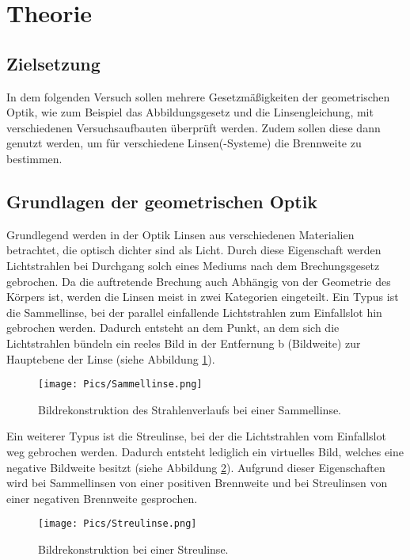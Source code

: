 \section{Theorie}

\subsection{Zielsetzung}

In dem folgenden Versuch sollen mehrere Gesetzmäßigkeiten der geometrischen Optik,
wie zum Beispiel das Abbildungsgesetz und die Linsengleichung, mit verschiedenen
Versuchsaufbauten überprüft werden. Zudem sollen diese dann genutzt werden, um
für verschiedene Linsen(-Systeme) die Brennweite zu bestimmen.

\subsection{Grundlagen der geometrischen Optik}

Grundlegend werden in der Optik Linsen aus verschiedenen Materialien betrachtet,
die optisch dichter sind als Licht. Durch diese Eigenschaft werden Lichtstrahlen
bei Durchgang solch eines Mediums nach dem Brechungsgesetz gebrochen. Da die
auftretende Brechung auch Abhängig von der Geometrie des Körpers ist, werden
die Linsen meist in zwei Kategorien eingeteilt. Ein Typus ist die Sammellinse, bei
der parallel einfallende Lichtstrahlen zum Einfallslot hin gebrochen werden.
Dadurch entsteht an dem Punkt, an dem sich die Lichtstrahlen bündeln ein reeles
Bild in der Entfernung b (Bildweite) zur Hauptebene der Linse (siehe Abbildung
\ref{fig:Sammellinse}).

\begin{figure}
  \centering
  \texttt{[image: Pics/Sammellinse.png]}
  \caption{Bildrekonstruktion des Strahlenverlaufs bei einer Sammellinse.\cite{anleitung01}}
  \label{fig:Sammellinse}
\end{figure}

Ein weiterer Typus ist die Streulinse, bei der die Lichtstrahlen vom Einfallslot
weg gebrochen werden. Dadurch entsteht lediglich ein virtuelles Bild, welches
eine negative Bildweite besitzt (siehe Abbildung \ref{fig:Streulinse}). Aufgrund dieser
Eigenschaften wird bei Sammellinsen von einer positiven Brennweite und bei
Streulinsen von einer negativen Brennweite gesprochen.

\begin{figure}
  \centering
  \texttt{[image: Pics/Streulinse.png]}
  \caption{Bildrekonstruktion bei einer Streulinse. \cite{anleitung01}}
  \label{fig:Streulinse}
\end{figure}

